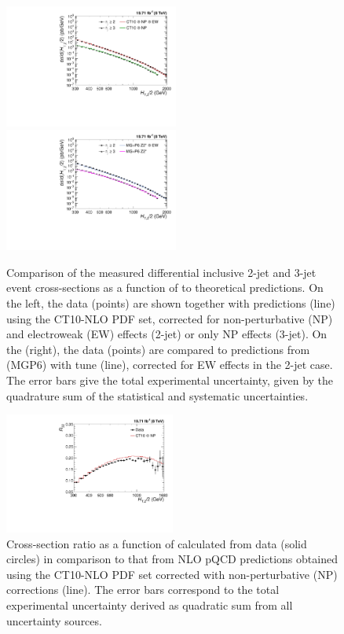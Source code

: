 \begin{figure}[!h]
 \hspace*{-5mm}\includegraphics[width=0.51\textwidth]{Plots_HT_2_150/Comparison_data_theory_EW.pdf}%
 ~~\includegraphics[width=0.51\textwidth]{Plots_HT_2_150/Comparison_data_MC_EW.pdf}\\
 \caption[]{Comparison of the measured differential inclusive 2-jet and 3-jet event cross-sections as a function of \httwo to theoretical predictions. On the left, the data (points) are shown together with \NLOJETPP predictions (line) using the CT10-NLO PDF set, corrected for non-perturbative (NP) and electroweak (EW) effects (2-jet) or only NP effects (3-jet). On the (right), the data (points) are compared to predictions from \MadGraphFn \plusn \PYTHIAS (MG\plusn P6) with tune \Ztwostar (line), corrected for EW effects in the 2-jet case. The error bars give the total experimental uncertainty, given by the quadrature sum of the statistical and systematic uncertainties.}
 \label{fig:data_NL0_MC}
\end{figure}

\begin{figure}[!h]
 \begin{center}
 \includegraphics[width=0.50\textwidth]{Plots_HT_2_150/Sensitivity_ratio_32_CT10_only.pdf}%
 \caption{Cross-section ratio \ratio as a function of \httwo calculated from data (solid circles) in comparison to that from NLO pQCD predictions obtained using the CT10-NLO PDF set corrected with non-perturbative (NP) corrections (line). The error bars correspond to the total experimental uncertainty derived as quadratic sum from all uncertainty sources.}
 \label{fig:ratiosens}
 \end{center}
\end{figure}

